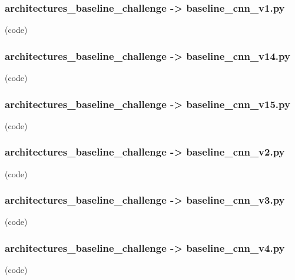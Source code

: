 \begin{myparindent}{0pt}

\noindent\subsubsection[baseline\_cnn\_v1.py]{architectures\_baseline\_challenge -> baseline\_cnn\_v1.py} (code)

\noindent\subsubsection[baseline\_cnn\_v14.py]{architectures\_baseline\_challenge -> baseline\_cnn\_v14.py} (code)

\noindent\subsubsection[baseline\_cnn\_v15.py]{architectures\_baseline\_challenge -> baseline\_cnn\_v15.py} (code)

\noindent\subsubsection[baseline\_cnn\_v2.py]{architectures\_baseline\_challenge -> baseline\_cnn\_v2.py} (code)

\noindent\subsubsection[baseline\_cnn\_v3.py]{architectures\_baseline\_challenge -> baseline\_cnn\_v3.py} (code)

\noindent\subsubsection[baseline\_cnn\_v4.py]{architectures\_baseline\_challenge -> baseline\_cnn\_v4.py} (code)


\end{myparindent}

